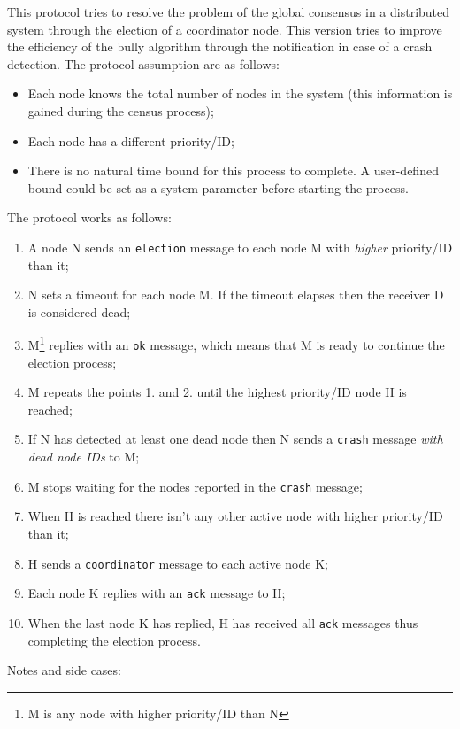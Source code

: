 This protocol tries to resolve the problem of the global consensus in a distributed system through the election
of a coordinator node. This version tries to improve the efficiency of the bully algorithm through the notification in case of a crash detection. The protocol assumption are as follows:
\begin{itemize}
\item Each node knows the total number of nodes in the system (this
  information is gained during the census process);
\item Each node has a different priority/ID;
\item There is no natural time bound for this process to complete. A
  user-defined bound could be set as a system parameter before starting the
  process.
\end{itemize}
The protocol works as follows:
\begin{enumerate}
\item A node N sends an \texttt{election} message to each node M with
  \textit{higher} priority/ID than it;
\item N sets a timeout for each node M. If the timeout elapses then the
  receiver D is considered dead;
\item M\footnote{M is any node with higher priority/ID than N} replies with an
  \texttt{ok} message, which means that M is ready to continue the election
  process;
\item M repeats the points 1. and 2. until the highest priority/ID node H is
  reached;
\item If N has detected at least one dead node then N sends a \texttt{crash}
  message \textit{with dead node IDs} to M;
\item M stops waiting for the nodes reported in the \texttt{crash} message;
\item When H is reached there isn't any other active node with higher
  priority/ID than it;
\item H sends a \texttt{coordinator} message to each active node K;
\item Each node K replies with an \texttt{ack} message to H;
\item When the last node K has replied, H has received all \texttt{ack}
  messages thus completing the election process.
\end{enumerate}
Notes and side cases:
